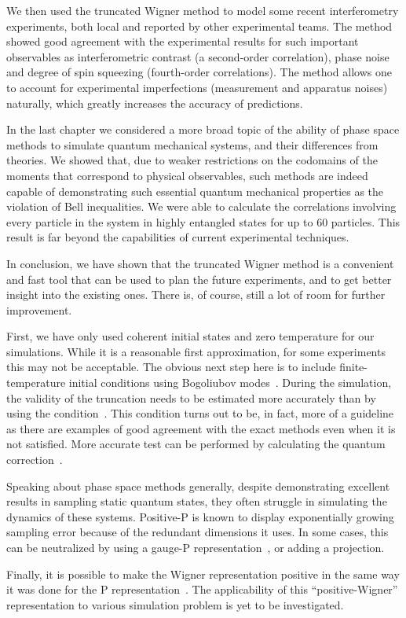 We then used the truncated Wigner method to model some recent  interferometry experiments, both local and reported by other experimental teams.
The method showed good agreement with the experimental results for such important observables as interferometric contrast (a second-order correlation), phase noise and degree of spin squeezing (fourth-order correlations).
The method allows one to account for experimental imperfections (measurement and apparatus noises) naturally, which greatly increases the accuracy of predictions.

In the last chapter we considered a more broad topic of the ability of phase space methods to simulate quantum mechanical systems, and their differences from  theories.
We showed that, due to weaker restrictions on the codomains of the moments that correspond to physical observables, such methods are indeed capable of demonstrating such essential quantum mechanical properties as the violation of Bell inequalities.
We were able to calculate the correlations involving every particle in the system in highly entangled  states for up to $60$ particles.
This result is far beyond the capabilities of current experimental techniques.

\centerline{\vfleuron}

In conclusion, we have shown that the truncated Wigner method is a convenient and fast tool that can be used to plan the future experiments, and to get better insight into the existing ones.
There is, of course, still a lot of room for further improvement.

First, we have only used coherent initial states and zero temperature for our simulations.
While it is a reasonable first approximation, for some experiments this may not be acceptable.
The obvious next step here is to include finite-temperature initial conditions using Bogoliubov modes~\cite{Steel1998,Sinatra2002,Ruostekoski2005,Isella2006,Blakie2008}.
During the simulation, the validity of the truncation needs to be estimated more accurately than by using the condition~.
This condition turns out to be, in fact, more of a guideline as there are examples of good agreement with the exact methods even when it is not satisfied.
More accurate test can be performed by calculating the quantum correction~\cite{Polkovnikov2010}.

Speaking about phase space methods generally, despite demonstrating excellent results in sampling static quantum states, they often struggle in simulating the dynamics of these systems.
Positive-P is known to display exponentially growing sampling error because of the redundant dimensions it uses.
In some cases, this can be neutralized by using a gauge-P representation~\cite{Deuar2002,Deuar2005a}, or adding a projection.

Finally, it is possible to make the Wigner representation positive in the same way it was done for the P representation~\cite{Plimak2001}.
The applicability of this ``positive-Wigner'' representation to various simulation problem is yet to be investigated.

